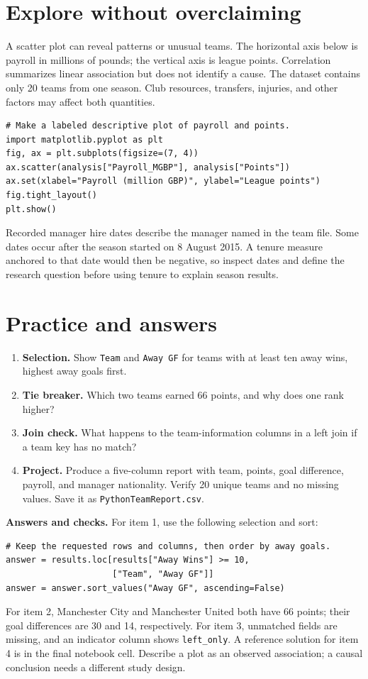\documentclass[11pt,letterpaper]{article}
\begin{document}
\section{Explore without overclaiming}
A scatter plot can reveal patterns or unusual teams. The horizontal axis below is payroll in millions of pounds; the vertical axis is league points. Correlation summarizes linear association but does not identify a cause. The dataset contains only 20 teams from one season. Club resources, transfers, injuries, and other factors may affect both quantities.

\begin{lstlisting}
# Make a labeled descriptive plot of payroll and points.
import matplotlib.pyplot as plt
fig, ax = plt.subplots(figsize=(7, 4))
ax.scatter(analysis["Payroll_MGBP"], analysis["Points"])
ax.set(xlabel="Payroll (million GBP)", ylabel="League points")
fig.tight_layout()
plt.show()
\end{lstlisting}

Recorded manager hire dates describe the manager named in the team file. Some dates occur after the season started on 8 August 2015. A tenure measure anchored to that date would then be negative, so inspect dates and define the research question before using tenure to explain season results.

\section{Practice and answers}
\begin{enumerate}
\item \textbf{Selection.} Show \texttt{Team} and \texttt{Away GF} for teams with at least ten away wins, highest away goals first.
\item \textbf{Tie breaker.} Which two teams earned 66 points, and why does one rank higher?
\item \textbf{Join check.} What happens to the team-information columns in a left join if a team key has no match?
\item \textbf{Project.} Produce a five-column report with team, points, goal difference, payroll, and manager nationality. Verify 20 unique teams and no missing values. Save it as \texttt{PythonTeamReport.csv}.
\end{enumerate}

\noindent\textbf{Answers and checks.} For item 1, use the following selection and sort:
\begin{lstlisting}
# Keep the requested rows and columns, then order by away goals.
answer = results.loc[results["Away Wins"] >= 10,
                     ["Team", "Away GF"]]
answer = answer.sort_values("Away GF", ascending=False)
\end{lstlisting}
For item 2, Manchester City and Manchester United both have 66 points; their goal differences are 30 and 14, respectively. For item 3, unmatched fields are missing, and an indicator column shows \texttt{left\_only}. A reference solution for item 4 is in the final notebook cell. Describe a plot as an observed association; a causal conclusion needs a different study design.
\end{document}
